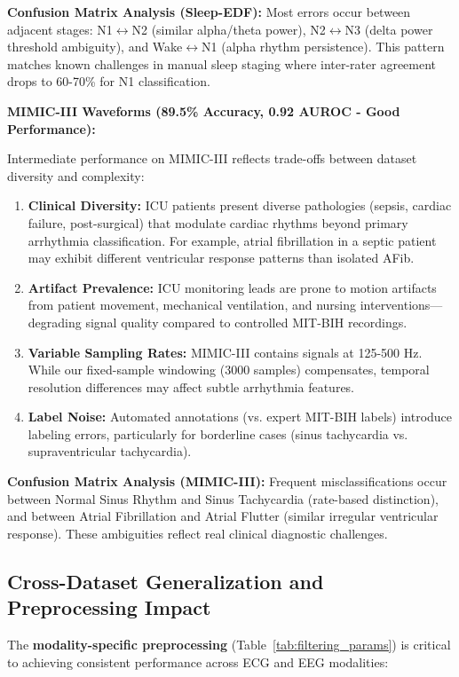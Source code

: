 \documentclass[conference]{IEEEtran}
\begin{document}
\textbf{Confusion Matrix Analysis (Sleep-EDF):} Most errors occur between adjacent stages: N1$\leftrightarrow$N2 (similar alpha/theta power), N2$\leftrightarrow$N3 (delta power threshold ambiguity), and Wake$\leftrightarrow$N1 (alpha rhythm persistence). This pattern matches known challenges in manual sleep staging where inter-rater agreement drops to 60-70\% for N1 classification.

\textbf{MIMIC-III Waveforms (89.5\% Accuracy, 0.92 AUROC - Good Performance):}

Intermediate performance on MIMIC-III reflects trade-offs between dataset diversity and complexity:
\begin{enumerate}
\item \textbf{Clinical Diversity:} ICU patients present diverse pathologies (sepsis, cardiac failure, post-surgical) that modulate cardiac rhythms beyond primary arrhythmia classification. For example, atrial fibrillation in a septic patient may exhibit different ventricular response patterns than isolated AFib.
\item \textbf{Artifact Prevalence:} ICU monitoring leads are prone to motion artifacts from patient movement, mechanical ventilation, and nursing interventions—degrading signal quality compared to controlled MIT-BIH recordings.
\item \textbf{Variable Sampling Rates:} MIMIC-III contains signals at 125-500 Hz. While our fixed-sample windowing (3000 samples) compensates, temporal resolution differences may affect subtle arrhythmia features.
\item \textbf{Label Noise:} Automated annotations (vs. expert MIT-BIH labels) introduce labeling errors, particularly for borderline cases (sinus tachycardia vs. supraventricular tachycardia).
\end{enumerate}

\textbf{Confusion Matrix Analysis (MIMIC-III):} Frequent misclassifications occur between Normal Sinus Rhythm and Sinus Tachycardia (rate-based distinction), and between Atrial Fibrillation and Atrial Flutter (similar irregular ventricular response). These ambiguities reflect real clinical diagnostic challenges.

\subsection{Cross-Dataset Generalization and Preprocessing Impact}

The \textbf{modality-specific preprocessing} (Table~\ref{tab:filtering_params}) is critical to achieving consistent performance across ECG and EEG modalities:
\end{document}
